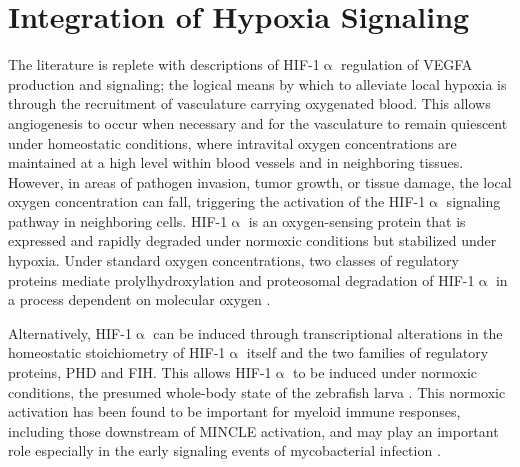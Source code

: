 \section{Integration of Hypoxia Signaling}\label{hypoxia}

The literature is replete with descriptions of HIF\hyp{}1$\upalpha$ regulation of VEGFA production and signaling; the logical means by which to alleviate local hypoxia is through the recruitment of vasculature carrying oxygenated blood. This allows angiogenesis to occur when necessary and for the vasculature to remain quiescent under homeostatic conditions, where intravital oxygen concentrations are maintained at a high level within blood vessels and in neighboring tissues. However, in areas of pathogen invasion, tumor growth, or tissue damage, the local oxygen concentration can fall, triggering the activation of the HIF\hyp{}1$\upalpha$ signaling pathway in neighboring cells. HIF\hyp{}1$\upalpha$ is an oxygen\hyp{}sensing protein that is expressed and rapidly degraded under normoxic conditions but stabilized under hypoxia. Under standard oxygen concentrations, two classes of regulatory proteins mediate prolylhydroxylation and proteosomal degradation of HIF\hyp{}1$\upalpha$ in a process dependent on molecular oxygen \citep{Hong2004, Masoud2015, Corcoran2016}.

Alternatively, HIF\hyp{}1$\upalpha$ can be induced through transcriptional alterations in the homeostatic stoichiometry of HIF\hyp{}1$\upalpha$ itself and the two families of regulatory proteins, PHD and FIH. This allows HIF\hyp{}1$\upalpha$ to be induced under normoxic conditions, the presumed whole\hyp{}body state of the zebrafish larva \citep{Ellertsdottir2010}. This normoxic activation has been found to be important for myeloid immune responses, including those downstream of MINCLE activation, and may play an important role especially in the early signaling events of mycobacterial infection \citep{Nishi2008, Schoenen2014, Schatz2016, Thompson2017}. 


